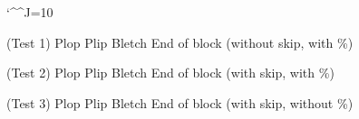\documentclass{article}
\begin{document}
\catcode`\^^J=10
\def\pu{\directlua{pu()}}


\pu

(Test 1)
%
Plop
 Plip
  Bletch
End of block
(without skip, with \%)


(Test 2)
%
Plop
 Plip
  Bletch
End of block
(with skip, with \%)


(Test 3)
Plop
 Plip
  Bletch
End of block
(with skip, without \%)
\end{document}
